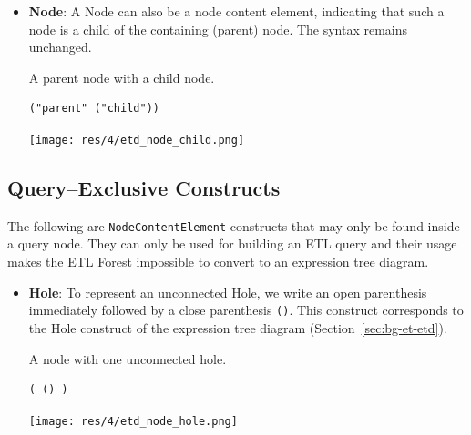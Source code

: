 \begin{chapterBody}
\begin{itemize}
    \item \textbf{Node}: A Node can also be a node content element, indicating
that such a node is a child of the containing (parent) node. The syntax remains
unchanged.

\begin{minipage}{.3\linewidth}
A parent node with a child node.
\end{minipage}
\hspace{.02\linewidth}
\begin{minipage}{.3\linewidth}
\begin{lstlisting}[language=etl]
("parent" ("child"))
\end{lstlisting} 
\end{minipage}
\hspace{.02\linewidth}
\begin{minipage}{.3\linewidth}
\texttt{[image: res/4/etd\_node\_child.png]}
\end{minipage}
\end{itemize}

\subsection{Query–Exclusive Constructs}

The following are \texttt{NodeContentElement} constructs that may only be found
inside a query node. They can only be used for building an ETL query and their
usage makes the ETL Forest impossible to convert to an expression tree diagram.

\begin{itemize}
    \item \textbf{Hole}: To represent an unconnected Hole, we write an
open parenthesis immediately followed by a close parenthesis \texttt{()}. This
construct corresponds to the Hole  construct of the expression tree diagram
(Section~\ref{sec:bg-et-etd}).

\begin{minipage}{.3\linewidth}
A node with one \hfill\break
unconnected hole.
\end{minipage}
\hspace{.02\linewidth}
\begin{minipage}{.3\linewidth}
\begin{lstlisting}[language=etl]
( () )
\end{lstlisting} 
\end{minipage}
\hspace{.02\linewidth}
\begin{minipage}{.3\linewidth}
\texttt{[image: res/4/etd\_node\_hole.png]}
\end{minipage}


\end{itemize}
\end{chapterBody}

